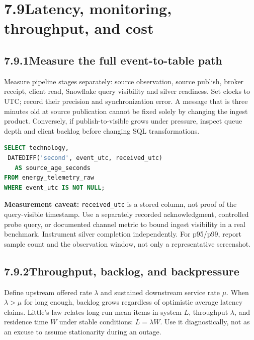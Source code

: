 \documentclass[11pt,twoside]{article}
\newcommand{\topic}[2]{\subsection*{#1\quad #2}}
\begin{document}
\section*{7.9\quad Latency, monitoring, throughput, and cost}
\topic{7.9.1}{Measure the full event-to-table path}
Measure pipeline stages separately: source observation, source publish, broker receipt, client read, Snowflake query visibility and silver readiness. Set clocks to UTC; record their precision and synchronization error. A message that is three minutes old at source publication cannot be fixed solely by changing the ingest product. Conversely, if publish-to-visible grows under pressure, inspect queue depth and client backlog before changing SQL transformations.
\begin{lstlisting}[language=SQL,caption={Freshness query against an approved raw table.}]
SELECT technology,
 DATEDIFF('second', event_utc, received_utc)
   AS source_age_seconds
FROM energy_telemetry_raw
WHERE event_utc IS NOT NULL;
\end{lstlisting}
\textbf{Measurement caveat:} \texttt{received\_utc} is a stored column, not proof of the query-visible timestamp. Use a separately recorded acknowledgment, controlled probe query, or documented channel metric to bound ingest visibility in a real benchmark. Instrument silver completion independently. For p95/p99, report sample count and the observation window, not only a representative screenshot.
\topic{7.9.2}{Throughput, backlog, and backpressure}
Define upstream offered rate \(\lambda\) and sustained downstream service rate \(\mu\). When \(\lambda>\mu\) for long enough, backlog grows regardless of optimistic average latency claims. Little's law relates long-run mean items-in-system \(L\), throughput \(\lambda\), and residence time \(W\) under stable conditions: \(L=\lambda W\). Use it diagnostically, not as an excuse to assume stationarity during an outage.
\end{document}
